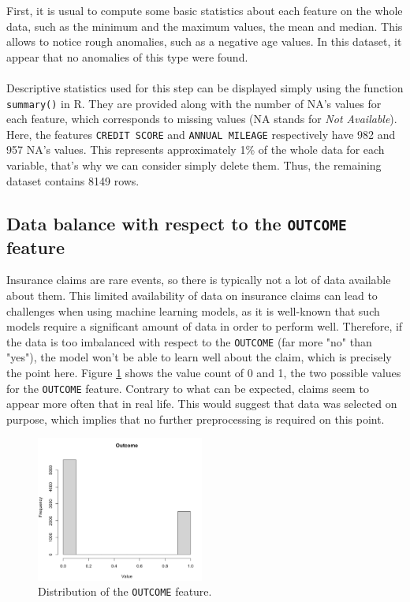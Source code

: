 \documentclass[a4paper,11pt, titlepage]{article}
\begin{document}
First, it is usual to compute some basic statistics about each feature on the whole data, such as the minimum and the maximum values, the mean and median. This allows to notice rough anomalies, such as a negative age values. In this dataset, it appear that no anomalies of this type were found.\\
\\
\noindent Descriptive statistics used for this step can be displayed simply using the function {\tt summary()} in R. They are provided along with the number of NA's values for each feature, which corresponds to missing values (NA stands for \textsl{Not Available}). Here, the features {\tt CREDIT SCORE} and {\tt ANNUAL MILEAGE} respectively have 982 and 957 NA's values. This represents approximately 1\% of the whole data for each variable, that's why we can consider simply delete them. Thus, the remaining dataset contains 8149 rows. 

\subsection{Data balance with respect to the {\tt OUTCOME} feature}

Insurance claims are rare events, so there is typically not a lot of data available about them. This limited availability of data on insurance claims can lead to challenges when using machine learning models, as it is well-known that such models require a significant amount of data in order to perform well. Therefore, if the data is too imbalanced with respect to the {\tt OUTCOME} (far more "no" than "yes"), the model won't be able to learn well about the claim, which is precisely the point here. Figure \ref{fig:outcome} shows the value count of 0 and 1, the two possible values for the {\tt OUTCOME} feature. Contrary to what can be expected, claims seem to appear more often that in real life. This would suggest that data was selected on purpose, which implies that no further preprocessing is required on this point. 

\begin{figure}
    \centering
    \includegraphics[width=5.5cm]{outcome.png}
    \caption{\centering Distribution of the {\tt OUTCOME} feature.}
    \label{fig:outcome}
\end{figure}
\end{document}
